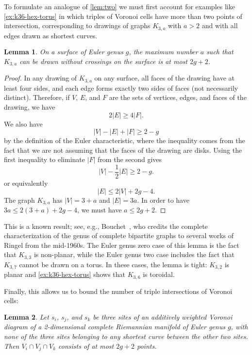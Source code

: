 \documentclass[11pt]{article}
\newtheorem{lemma}{Lemma}
\theoremstyle{definition}
\begin{document}
To formulate an analogue of \cref{lem:two} we must first account for examples like \cref{ex:k36-hex-torus} in which triples of Voronoi cells have more than two points of intersection, corresponding to drawings of graphs $K_{3,a}$ with $a>2$ and with all edges drawn as shortest curves.

\begin{lemma}
\label{lem:genus-bipartite}
On a surface of Euler genus $g$, the maximum number $a$ such that $K_{3,a}$ can be drawn without crossings on the surface is at most $2g+2$.
\end{lemma}

\begin{proof}
In any drawing of $K_{3,a}$ on any surface, all faces of the drawing have at least four sides, and each edge forms exactly two sides of faces (not necessarily distinct). Therefore, if $V$, $E$, and $F$ are the sets of vertices, edges, and faces of the drawing, we have  
\[
2|E|\ge 4|F|.\]
We also have
\[
|V|-|E|+|F|\ge 2-g
\]
by the definition of the Euler characteristic, where the inequality comes from the fact that we are not assuming that the faces of the drawing are disks. Using the first inequality to eliminate $|F|$ from the second gives
\[
|V|-\frac12 |E|\ge 2-g.
\]
or equivalently
\[
|E|\le 2|V| + 2g - 4.
\]
The graph $K_{3,a}$ has $|V|=3+a$ and $|E|=3a$. In order to have $3a\le 2(3+a)+2g-4$,
we must have $a\le 2g+2$.
\end{proof}

This is a known result; see, e.g., Bouchet~\cite{Bou-JCTB-78}, who credits the complete characterization of the genus of complete bipartite graphs to several works of Ringel from the mid-1960s. The Euler genus zero case of this lemma is the fact that $K_{3,3}$ is non-planar, while the Euler genus two case includes the fact that $K_{3,7}$ cannot be drawn on a torus. In these cases, the lemma is tight: $K_{3,2}$ is planar and \cref{ex:k36-hex-torus} shows that $K_{3,6}$ is toroidal.

Finally, this allows us to bound the number of triple intersections of Voronoi cells:

\begin{lemma}
\label{lem:Riemann-triples}
Let $s_i$, $s_j$, and $s_k$ be three sites of an additively weighted Voronoi diagram of a 2-dimensional complete Riemannian manifold of Euler genus $g$, with none of the three sites belonging to any shortest curve between the other two sites. Then $V_i\cap V_j\cap V_k$ consists of at most $2g+2$ points.
\end{lemma}
\end{document}
